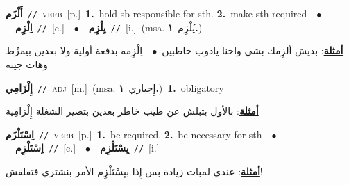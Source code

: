 \documentclass[10pt,a4paper,twoside]{article} %
\begin{document}
\begin{multicols}{2}
{\setlength\topsep{0pt}\textbf{\foreignlanguage{arabic}{أَلْزَم}}\ {\color{gray}\texttt{//}\color{black}}\ \textsc{verb}\ [p.]\ \textbf{1.}~hold sb responsible for sth.  \textbf{2.}~make sth required\ \ $\bullet$\ \ \setlength\topsep{0pt}\textbf{\foreignlanguage{arabic}{اِلْزِم}}\ {\color{gray}\texttt{//}\color{black}}\ [c.]\ \ $\bullet$\ \ \setlength\topsep{0pt}\textbf{\foreignlanguage{arabic}{يِلْزِم}}\ {\color{gray}\texttt{//}\color{black}}\ [i.]\ \color{gray}(msa. \foreignlanguage{arabic}{يُلْزِم}~\foreignlanguage{arabic}{\textbf{١.}})\color{black}\  \begin{flushright}\color{gray}\foreignlanguage{arabic}{\textbf{\underline{\foreignlanguage{arabic}{أمثلة}}}: بديش ألزِمك بشي واحنا يادوب خاطبين\ $\bullet$\ \  اِلْزِمه بدفعة أولية ولا بعدين بيمزُط وهات جيبه}\end{flushright}\color{black}} \vspace{2mm}

{\setlength\topsep{0pt}\textbf{\foreignlanguage{arabic}{إِلْزَامِي}}\ {\color{gray}\texttt{//}\color{black}}\ \textsc{adj}\ [m.]\ \color{gray}(msa. \foreignlanguage{arabic}{إِجباري}~\foreignlanguage{arabic}{\textbf{١.}})\color{black}\ \textbf{1.}~obligatory\  \begin{flushright}\color{gray}\foreignlanguage{arabic}{\textbf{\underline{\foreignlanguage{arabic}{أمثلة}}}: بالأول بتبلش عن طيب خاطر بعدين بتصير الشغلة إِلْزامِية}\end{flushright}\color{black}} \vspace{2mm}

{\setlength\topsep{0pt}\textbf{\foreignlanguage{arabic}{اِسْتَلْزَم}}\ {\color{gray}\texttt{//}\color{black}}\ \textsc{verb}\ [p.]\ \textbf{1.}~be required.  \textbf{2.}~be necessary for sth\ \ $\bullet$\ \ \setlength\topsep{0pt}\textbf{\foreignlanguage{arabic}{اِسْتَلْزِم}}\ {\color{gray}\texttt{//}\color{black}}\ [c.]\ \ $\bullet$\ \ \setlength\topsep{0pt}\textbf{\foreignlanguage{arabic}{يِسْتَلْزِم}}\ {\color{gray}\texttt{//}\color{black}}\ [i.]\  \begin{flushright}\color{gray}\foreignlanguage{arabic}{\textbf{\underline{\foreignlanguage{arabic}{أمثلة}}}: عندي لمبات زيادة بس إِذا بيِسْتَلْزِم الأمر بنشتري فتقلقش!}\end{flushright}\color{black}} \vspace{2mm}


\end{multicols}
\end{document}
